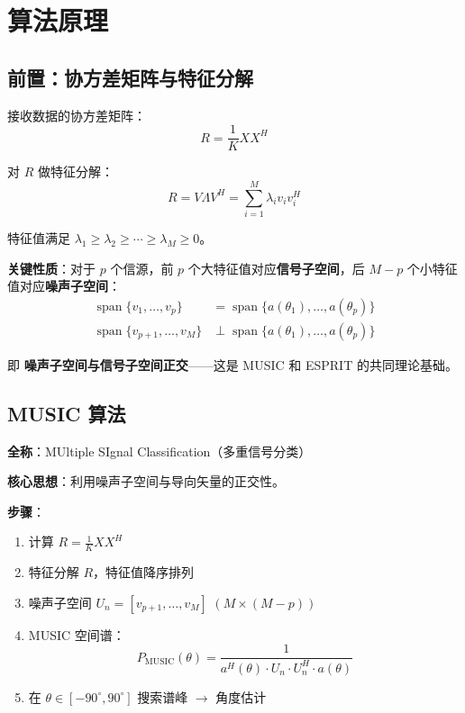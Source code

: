 \documentclass[11pt,a4paper]{article}
\begin{document}
\section{算法原理}

\subsection{前置：协方差矩阵与特征分解}

接收数据的协方差矩阵：
\begin{equation}
R = \frac{1}{K} X X^H
\end{equation}

对 $R$ 做特征分解：
\begin{equation}
R = V \Lambda V^H = \sum_{i=1}^{M} \lambda_i v_i v_i^H
\end{equation}

特征值满足 $\lambda_1 \ge \lambda_2 \ge \cdots \ge \lambda_M \ge 0$。

\textbf{关键性质}：对于 $p$ 个信源，前 $p$ 个大特征值对应\textbf{信号子空间}，后 $M-p$ 个小特征值对应\textbf{噪声子空间}：
\begin{align}
\operatorname{span}\{v_1, \ldots, v_p\} &= \operatorname{span}\{a(\theta_1), \ldots, a(\theta_p)\} \\
\operatorname{span}\{v_{p+1}, \ldots, v_M\} &\perp \operatorname{span}\{a(\theta_1), \ldots, a(\theta_p)\}
\end{align}

即 \textbf{噪声子空间与信号子空间正交}——这是 MUSIC 和 ESPRIT 的共同理论基础。

\subsection{MUSIC 算法}

\textbf{全称}：MUltiple SIgnal Classification（多重信号分类）

\textbf{核心思想}：利用噪声子空间与导向矢量的正交性。

\textbf{步骤}：
\begin{enumerate}
    \item 计算 $R = \frac{1}{K} X X^H$
    \item 特征分解 $R$，特征值降序排列
    \item 噪声子空间 $U_n = [v_{p+1}, \ldots, v_M]$ \hfill $(M \times (M-p))$
    \item MUSIC 空间谱：
    \begin{equation}
    P_{\text{MUSIC}}(\theta) = \frac{1}{a^H(\theta) \cdot U_n \cdot U_n^H \cdot a(\theta)}
    \end{equation}
    \item 在 $\theta \in [-90^\circ, 90^\circ]$ 搜索谱峰 $\to$ 角度估计
\end{enumerate}
\end{document}
